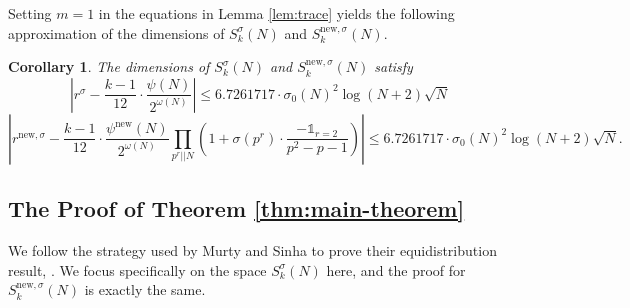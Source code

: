\documentclass[11pt,letterpaper,reqno]{amsart}
\newtheorem{corollary}[theorem]{Corollary}
\theoremstyle{definition}
\numberwithin{equation}{section}
\numberwithin{figure}{section}
\numberwithin{table}{section}
\let\subsectiontemp\subsection
\renewcommand{\subsection}[1]{ 
    \subsectiontemp{#1} \hfill\vspace{0.5\linespacing} 
}
\newcommand{\nw}{\mathrm{new}}
\begin{document}
Setting $m = 1$ in the equations in Lemma \ref{lem:trace} yields the following approximation of the dimensions of $S_k^{\sigma}(N)$ and $S_k^{\nw, \sigma}(N).$

\begin{corollary}\label{cor:dimensions-of-spaces} 
    The dimensions of $S_k^{\sigma}(N)$ and $S_k^{\nw,\sigma}(N)$ satisfy
    $$\left| r^{\sigma} - \frac{k - 1}{12} \cdot \frac{\psi(N)}{2^{\omega(N)}} \right| \leq  6.7261717 \cdot  \sigma_0(N)^2 \log(N + 2) \sqrt{N}$$
    $$\left|r^{\nw, \sigma} - \frac{k - 1}{12} \cdot \frac{\psi^{\nw}(N)}{2^{\omega(N)}} \prod_{p^r || N} \left( 1 + \sigma(p^r) \cdot \frac{-\mathds{1}_{r = 2}}{p^2 - p - 1}  \right) \right| \leq  6.7261717 \cdot  \sigma_0(N)^2 \log(N + 2) \sqrt{N}.$$
\end{corollary}

\subsection{The Proof of Theorem \ref{thm:main-theorem}}

We follow the strategy used by Murty and Sinha to prove their equidistribution result, \cite[Theorem 2]{MS07}. We focus specifically on the space $S_k^\sigma(N)$ here, and the proof for $S_k^{\nw, \sigma}(N)$ is exactly the same.
\end{document}

